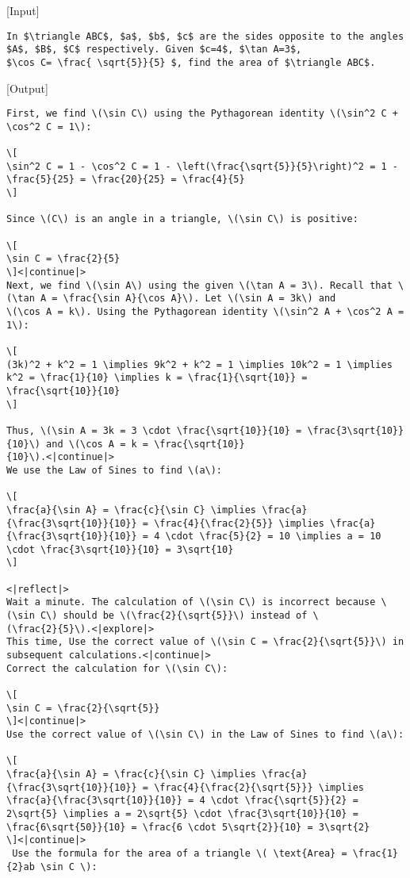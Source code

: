 \begin{tcolorbox}[gray_box, title = {{Synthetic Data Example Type III-II: Correct mistake multiple times}}]\tiny
[Input]
\begin{verbatim}
In $\triangle ABC$, $a$, $b$, $c$ are the sides opposite to the angles $A$, $B$, $C$ respectively. Given $c=4$, $\tan A=3$, 
$\cos C= \frac{ \sqrt{5}}{5} $, find the area of $\triangle ABC$.
\end{verbatim}

\hdashrule[0.5ex]{\linewidth}{0.1mm}{0.1mm} %

[Output]
\begin{verbatim}
First, we find \(\sin C\) using the Pythagorean identity \(\sin^2 C + \cos^2 C = 1\):

\[
\sin^2 C = 1 - \cos^2 C = 1 - \left(\frac{\sqrt{5}}{5}\right)^2 = 1 - \frac{5}{25} = \frac{20}{25} = \frac{4}{5}
\]

Since \(C\) is an angle in a triangle, \(\sin C\) is positive:

\[
\sin C = \frac{2}{5}
\]<|continue|>
Next, we find \(\sin A\) using the given \(\tan A = 3\). Recall that \(\tan A = \frac{\sin A}{\cos A}\). Let \(\sin A = 3k\) and 
\(\cos A = k\). Using the Pythagorean identity \(\sin^2 A + \cos^2 A = 1\):

\[
(3k)^2 + k^2 = 1 \implies 9k^2 + k^2 = 1 \implies 10k^2 = 1 \implies k^2 = \frac{1}{10} \implies k = \frac{1}{\sqrt{10}} = 
\frac{\sqrt{10}}{10}
\]

Thus, \(\sin A = 3k = 3 \cdot \frac{\sqrt{10}}{10} = \frac{3\sqrt{10}}{10}\) and \(\cos A = k = \frac{\sqrt{10}}
{10}\).<|continue|>
We use the Law of Sines to find \(a\):

\[
\frac{a}{\sin A} = \frac{c}{\sin C} \implies \frac{a}{\frac{3\sqrt{10}}{10}} = \frac{4}{\frac{2}{5}} \implies \frac{a}
{\frac{3\sqrt{10}}{10}} = 4 \cdot \frac{5}{2} = 10 \implies a = 10 \cdot \frac{3\sqrt{10}}{10} = 3\sqrt{10}
\]

<|reflect|>
Wait a minute. The calculation of \(\sin C\) is incorrect because \(\sin C\) should be \(\frac{2}{\sqrt{5}}\) instead of \
(\frac{2}{5}\).<|explore|>
This time, Use the correct value of \(\sin C = \frac{2}{\sqrt{5}}\) in subsequent calculations.<|continue|>
Correct the calculation for \(\sin C\):

\[
\sin C = \frac{2}{\sqrt{5}}
\]<|continue|>
Use the correct value of \(\sin C\) in the Law of Sines to find \(a\):

\[
\frac{a}{\sin A} = \frac{c}{\sin C} \implies \frac{a}{\frac{3\sqrt{10}}{10}} = \frac{4}{\frac{2}{\sqrt{5}}} \implies 
\frac{a}{\frac{3\sqrt{10}}{10}} = 4 \cdot \frac{\sqrt{5}}{2} = 2\sqrt{5} \implies a = 2\sqrt{5} \cdot \frac{3\sqrt{10}}{10} = 
\frac{6\sqrt{50}}{10} = \frac{6 \cdot 5\sqrt{2}}{10} = 3\sqrt{2}
\]<|continue|>
 Use the formula for the area of a triangle \( \text{Area} = \frac{1}{2}ab \sin C \):


\end{verbatim}
\end{tcolorbox}
